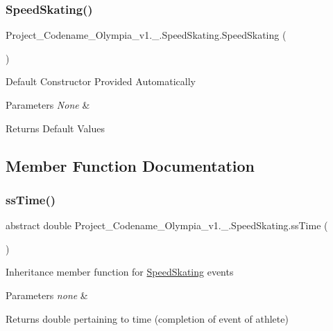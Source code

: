 \subsubsection{\texorpdfstring{Speed\+Skating()}{SpeedSkating()}}
{\footnotesize\ttfamily Project\+\_\+\+Codename\+\_\+\+Olympia\+\_\+v1.\+\_.\+Speed\+Skating.\+Speed\+Skating (\begin{DoxyParamCaption}{ }\end{DoxyParamCaption})\hspace{0.3cm}{\ttfamily [inline]}}

Default Constructor Provided Automatically 
\begin{DoxyParams}{Parameters}
{\em None} & \\
\hline
\end{DoxyParams}
\begin{DoxyReturn}{Returns}
Default Values 
\end{DoxyReturn}


\subsection{Member Function Documentation}
\mbox{\label{classProject__Codename__Olympia__v1_1_1__0_1_1SpeedSkating_acedc7b2f1bfab95ee054531364ea50fb}} 
\subsubsection{\texorpdfstring{ss\+Time()}{ssTime()}}
{\footnotesize\ttfamily abstract double Project\+\_\+\+Codename\+\_\+\+Olympia\+\_\+v1.\+\_.\+Speed\+Skating.\+ss\+Time (\begin{DoxyParamCaption}{ }\end{DoxyParamCaption})\hspace{0.3cm}{\ttfamily [pure virtual]}}

Inheritance member function for \hyperlink{classProject__Codename__Olympia__v1_1_1__0_1_1SpeedSkating}{Speed\+Skating} events 
\begin{DoxyParams}{Parameters}
{\em none} & \\
\hline
\end{DoxyParams}
\begin{DoxyReturn}{Returns}
double pertaining to time (completion of event of athlete) 
\end{DoxyReturn}


